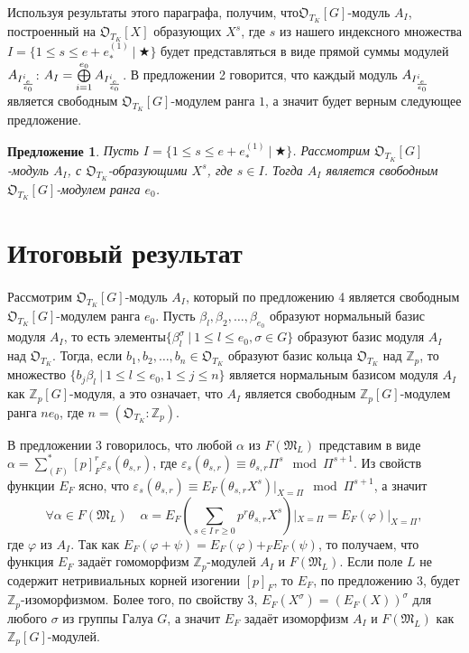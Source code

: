 \documentclass[a4paper]{article}
\newcommand{\Zp}{\mathbb{Z}_p}
\newcommand{\ML}{\mathfrak{M}_L}
\newcommand{\OTK}{\mathfrak{O}_{T_K}}
\newcommand{\Leq}{\leqslant}
\newcommand{\Geq}{\geqslant}
\newtheorem{proposition}{Предложение}
\begin{document}
Используя результаты этого параграфа, получим, что\linebreak $\OTK[G]$-модуль $A_I$, построенный на $\OTK[X]$ образующих $X^s$, где $s$ из нашего индексного множества $I=\{1\Leq s\Leq e+e_*^{(1)}\ |\ \bigstar\}$ будет представляться в виде прямой суммы модулей $A_{I_{e\over e_0}^i}$: $A_I=\bigoplus\limits_{i=1}^{e_0}A_{I_{e\over e_0}^i}$. В предложении 2 говорится, что каждый модуль $A_{I_{e\over e_0}^i}$ является свободным $\OTK[G]$-модулем ранга $1$, а значит будет верным следующее предложение.

\begin{proposition}
Пусть $I=\{1\Leq s\Leq e+e_*^{(1)}\ |\ \bigstar\}$. Рассмотрим $\OTK[G]$-модуль $A_I$, с $\OTK$-образующими $X^s$, где $s\in I$. Тогда $A_I$ является свободным $\OTK[G]$-модулем ранга $e_0$.
\end{proposition}


\section{Итоговый результат}

\paragraph{}

Рассмотрим $\OTK[G]$-модуль $A_I$, который по предложению 4 является свободным $\OTK[G]$-модулем ранга $e_0$. Пусть $\beta_l,\beta_2,\dots,\beta_{e_0}$ образуют нормальный базис модуля $A_I$, то есть элементы\linebreak $\{\beta_l^\sigma\ |\ 1\Leq l\Leq e_0,\sigma\in G\}$ образуют базис модуля $A_I$ над $\OTK$. Тогда, если $b_1,b_2,\dots,b_n\in\OTK$ образуют базис кольца $\OTK$ над $\Zp$, то множество $\{b_j\beta_l\ |\ 1\Leq l\Leq e_0, 1\Leq j\Leq n\}$ является нормальным базисом модуля $A_I$ как $\Zp[G]$-модуля, а это означает, что $A_I$ является свободным $\Zp[G]$-модулем ранга $ne_0$, где $n=(\OTK:\Zp)$.

В предложении 3 говорилось, что любой $\alpha$ из $F(\ML)$ представим в виде $\alpha=\sum_{(F)}^*[p]^r_F\varepsilon_s(\theta_{s,r})$, где $\varepsilon_s(\theta_{s,r})\equiv\theta_{s,r}\Pi^{s}\mod\Pi^{s+1}$. Из свойств функции $E_F$ ясно, что $\varepsilon_s(\theta_{s,r})\equiv E_F(\theta_{s,r}X^s)|_{X=\Pi}\mod\Pi^{s+1}$, а значит
$$\forall\alpha\in F(\ML)\quad \alpha=E_F({\sum\limits_{s\in I\ r\Geq0}}p^r\theta_{s,r}X^s)|_{X=\Pi}=E_F(\varphi)|_{X=\Pi},$$
где $\varphi$ из $A_I$. Так как $E_F(\varphi+\psi)=E_F(\varphi)+_FE_F(\psi)$, то получаем, что функция $E_F$ задаёт гомоморфизм $\Zp$-модулей $A_I$ и $F(\ML)$. Если поле $L$ не содержит нетривиальных корней изогении $[p]_F$, то $E_F$, по предложению 3, будет $\Zp$-изоморфизмом. Более того, по свойству 3, $E_F(X^\sigma)=(E_F(X))^\sigma$ для любого $\sigma$ из группы Галуа $G$, а значит $E_F$ задаёт изоморфизм $A_I$ и $F(\ML)$ как $\Zp[G]$-модулей.
\end{document}
